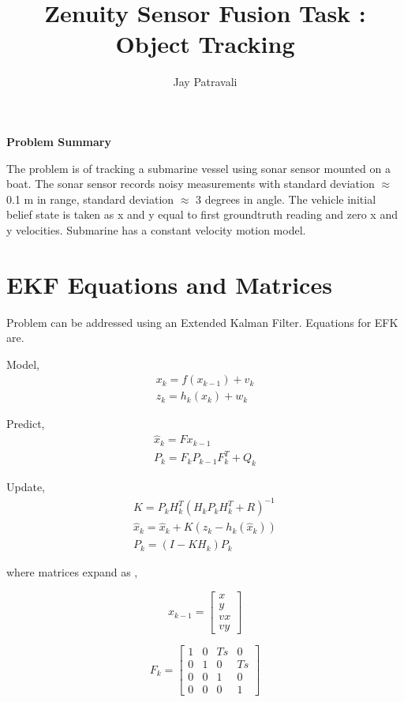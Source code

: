 \documentclass[12pt]{article}
\begin{document}

\title{Zenuity Sensor Fusion Task :  Object Tracking}
\author{Jay Patravali}


\maketitle \textbf{Problem Summary}

The problem is of tracking a submarine vessel using sonar sensor mounted on a boat. The sonar sensor records noisy measurements with standard deviation $\approx$  0.1
m in range, standard deviation  $\approx$ 3 degrees in angle. The vehicle initial belief state is taken as x and y equal to first groundtruth reading and zero x and y velocities.
Submarine has a constant velocity motion model.

\section{EKF Equations and Matrices}
Problem can be addressed using an Extended Kalman Filter. Equations for EFK are.

Model,
\begin{eqnarray}
x_k = f(x_{k-1})  + v_k \\
z_k = h_{k}(x_{k})  + w_k 
\end{eqnarray}

Predict,
\begin{eqnarray}
\hat{x}_k = Fx_{k-1} \\
P_k = F_{k} P_{k-1} F^T_{k} + Q_{k} 
\end{eqnarray}

Update,
\begin{eqnarray}
K = P_k H_k^T (H_k P_k H_k^T + R)^{-1} \\
\hat{x}_k = \hat{x}_{k} + K(z_{k} - h_{k}(\hat{x}_{k})) \\
P_k  = (I - K H_k) P_k
\end{eqnarray}

where matrices expand as ,

\[
x_{k-1}=
  \begin{bmatrix}
    x\\
    y\\
    vx\\
    vy
  \end{bmatrix}
\]


\[
F_{k}=
  \begin{bmatrix}
1 & 0 & Ts & 0\\
0 & 1  & 0 & Ts\\
0 & 0 & 1 &0\\
0 & 0 & 0 &1
  \end{bmatrix}
\]
\end{document}
